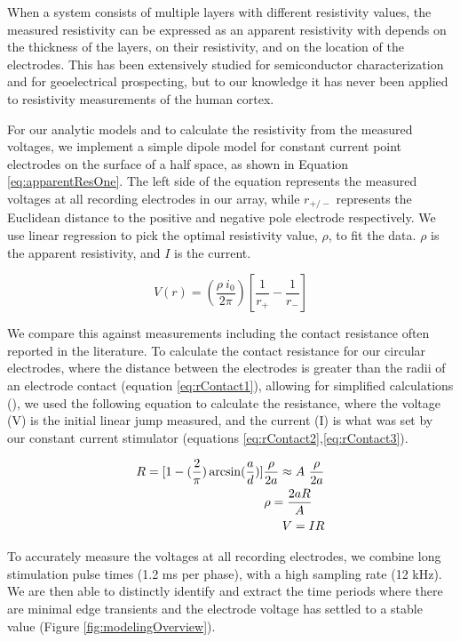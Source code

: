 When a system consists of multiple layers with different resistivity values, the measured resistivity can be expressed as an apparent resistivity with depends on the thickness of the layers, on their resistivity, and on the location of the electrodes. This has been extensively studied for semiconductor characterization and for geoelectrical prospecting, but to our knowledge it has never been applied to resistivity measurements of the human cortex. 

For our analytic models and to calculate the resistivity from the measured voltages, we implement a simple dipole model for constant current point electrodes on the surface of a half space, as shown in Equation \ref{eq:apparentResOne}. The left side of the equation represents the measured voltages at all recording electrodes in our array, while $ r_{+/-} $ represents the Euclidean distance to the positive and negative pole electrode respectively. We use linear regression to pick the optimal resistivity value, $ \rho $, to fit the data. $ \rho $  is the apparent resistivity, and $ I $ is the current.

\begin{equation}
V(r) = ( \frac{\rho \  i_0 } { 2 \pi}) [ \frac{1}{ r_+} -  \frac{1}{ r_-} ] \label{eq:apparentResOne}
\end{equation}

We compare this against measurements including the contact resistance often reported in the literature. To calculate the contact resistance for our circular electrodes, where the distance between the electrodes is greater than the radii of an electrode contact (equation \ref{eq:rContact1}), allowing for simplified calculations (\cite{Kristiansson2005a}), we used the following equation to calculate the resistance, where the voltage (V) is the initial linear jump measured, and the current (I) is what was set by our constant current stimulator (equations \ref{eq:rContact2},\ref{eq:rContact3}). 

\begin{align}
 R = [1 - (\frac{2}{ \pi} ) \arcsin(\frac{a}{d}) ]  \frac{\rho}{2a}  \approx A \ \frac{\rho}{2a} \label{eq:rContact1} \\
\rho = {2 a R \over A} \ \ \ \label{eq:rContact2} \\
V = IR  \label{eq:rContact3}
\end{align}

To accurately measure the voltages at all recording electrodes, we combine long stimulation pulse times (1.2 ms per phase), with a high sampling rate (12 kHz). We are then able to distinctly identify and extract the time periods where there are minimal edge transients and the electrode voltage has settled to a stable value (Figure \ref{fig:modelingOverview}).

